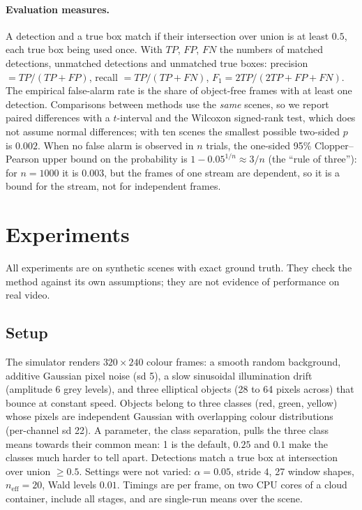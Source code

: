 \documentclass[11pt,a4paper]{article}
\theoremstyle{definition}
\begin{document}
\paragraph{Evaluation measures.}
A detection and a true box match if their intersection over union is at least $0.5$, each true box being used once. With $TP$, $FP$, $FN$ the numbers of matched detections, unmatched detections and unmatched true boxes: precision $=TP/(TP+FP)$, recall $=TP/(TP+FN)$, $F_1=2TP/(2TP+FP+FN)$. The empirical false-alarm rate is the share of object-free frames with at least one detection. Comparisons between methods use the \emph{same} scenes, so we report paired differences with a $t$-interval and the Wilcoxon signed-rank test, which does not assume normal differences; with ten scenes the smallest possible two-sided $p$ is $0.002$. When no false alarm is observed in $n$ trials, the one-sided 95\% Clopper--Pearson upper bound on the probability is $1-0.05^{1/n}\approx3/n$ (the ``rule of three''): for $n=1000$ it is $0.003$, but the frames of one stream are dependent, so it is a bound for the stream, not for independent frames.

\section{Experiments}\label{sec:experiments}
All experiments are on synthetic scenes with exact ground truth.
They check the method against its own assumptions; they are not evidence of performance on real video.

\subsection{Setup}\label{sec:setup}
The simulator renders $320\times240$ colour frames: a smooth random background, additive Gaussian pixel noise (sd 5), a slow sinusoidal illumination drift (amplitude 6 grey levels), and three elliptical objects (28 to 64 pixels across) that bounce at constant speed.
Objects belong to three classes (red, green, yellow) whose pixels are independent Gaussian with overlapping colour distributions (per-channel sd 22).
A parameter, the class separation, pulls the three class means towards their common mean: 1 is the default, $0.25$ and $0.1$ make the classes much harder to tell apart.
Detections match a true box at intersection over union $\ge 0.5$.
Settings were not varied: $\alpha=0.05$, stride $4$, 27 window shapes, $n_{\mathrm{eff}}=20$, Wald levels $0.01$.
Timings are per frame, on two CPU cores of a cloud container, include all stages, and are single-run means over the scene.
\end{document}

